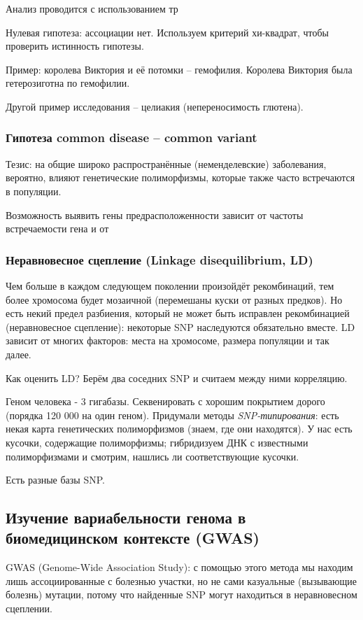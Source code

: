 \documentclass[main.tex]{subfiles}
\begin{document}
Анализ проводится с использованием тр

Нулевая гипотеза: ассоциации нет.
Используем критерий хи-квадрат, чтобы проверить истинность гипотезы.

Пример: королева Виктория и её потомки -- гемофилия.
Королева Виктория была гетерозиготна по гемофилии.

Другой пример исследования -- целиакия (непереносимость глютена).

\subsubsection{Гипотеза common disease -- common variant}

Тезис: на общие широко распространённые (неменделевские) заболевания, вероятно, влияют генетические полиморфизмы, которые также часто встречаются в популяции.

Возможность выявить гены предрасположенности зависит от частоты встречаемости гена и от

\subsubsection{ Неравновесное сцепление (Linkage disequilibrium, LD) }
Чем больше в каждом следующем поколении произойдёт рекомбинаций, тем более хромосома будет мозаичной (перемешаны куски от разных предков).
Но есть некий предел разбиения, который не может быть исправлен рекомбинацией (неравновесное сцепление): некоторые SNP наследуются обязательно вместе.
LD зависит от многих факторов: места на хромосоме, размера популяции и так далее.

Как оценить LD?
Берём два соседних SNP и считаем между ними корреляцию.

Геном человека - 3 гигабазы.
Секвенировать с хорошим покрытием дорого (порядка 120 000 на один геном).
Придумали методы \emph{SNP-типирования}: есть некая карта генетических полиморфизмов (знаем, где они находятся).
У нас есть кусочки, содержащие полиморфизмы; гибридизуем ДНК с известными полиморфизмами и смотрим, нашлись ли соответствующие кусочки.

Есть разные базы SNP.

\subsection{Изучение вариабельности генома в биомедицинском контексте (GWAS)}

GWAS (Genome-Wide Association Study): с помощью этого метода мы находим лишь ассоциированные с болезнью участки, но не сами казуальные (вызывающие болезнь) мутации, потому что найденные SNP могут находиться в неравновесном сцеплении.
\end{document}
